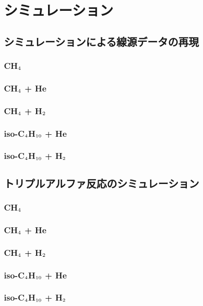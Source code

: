 \chapter{シミュレーション}
\label{chap::simulation}
\section{シミュレーションによる線源データの再現}
\subsection{CH$_{\text 4}$}
\subsection{CH$_{\text 4}$ + He}
\subsection{CH$_{\text 4}$ + H$_{\text 2}$}
\subsection{iso-C$_{\text 4}$H$_{\text 10}$ + He}
\subsection{iso-C$_{\text 4}$H$_{\text 10}$ + H$_{\text 2}$}
\section{トリプルアルファ反応のシミュレーション}
\subsection{CH$_{\text 4}$}
\subsection{CH$_{\text 4}$ + He}
\subsection{CH$_{\text 4}$ + H$_{\text 2}$}
\subsection{iso-C$_{\text 4}$H$_{\text 10}$ + He}
\subsection{iso-C$_{\text 4}$H$_{\text 10}$ + H$_{\text 2}$}
